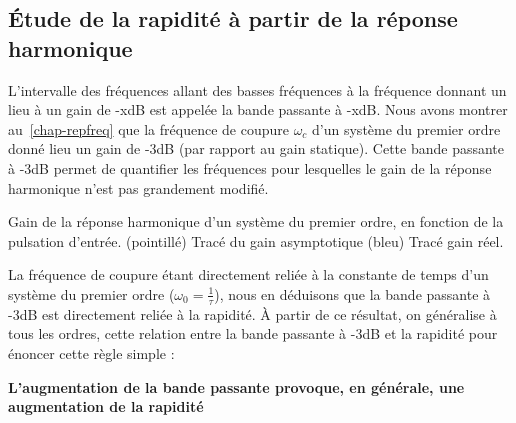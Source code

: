 \subsection{\'Etude de la rapidité à partir de la réponse harmonique}
L'intervalle des fréquences allant des basses fréquences à la 
fréquence donnant un lieu à un gain de -x\si{\dB} est appelée la bande 
passante à -x\si{\dB}.
Nous avons montrer au~\cref{chap-repfreq} que la fréquence de coupure $\omega_c$
d'un système du premier ordre donné lieu un gain de -3\si{\dB} 
(par rapport au gain statique). Cette bande passante à -3\si{\dB} permet 
de quantifier les fréquences pour lesquelles le gain de la réponse harmonique 
n'est pas grandement modifié. 
\begin{marginfigure}
    \centering
     
    \captionsetup{width=0.8\linewidth}
    \caption*{Gain de la réponse harmonique d'un système du premier ordre, 
    en fonction de la pulsation d'entrée. 
    (pointillé) Tracé du gain asymptotique (bleu) Tracé gain réel. }
\end{marginfigure}
La fréquence de coupure étant directement reliée à la constante de temps d'un 
système du premier ordre ($\omega_0=\frac{1}{\tau}$), nous en déduisons que la
bande passante à -3\si{\dB} est directement reliée à la rapidité. 
À partir de ce résultat, on généralise
à tous les ordres, cette relation entre la bande passante à 
-3\si{\dB} et la rapidité pour énoncer cette règle simple :

\textbf{L'augmentation de la bande passante provoque, en générale, une 
augmentation de la rapidité}
